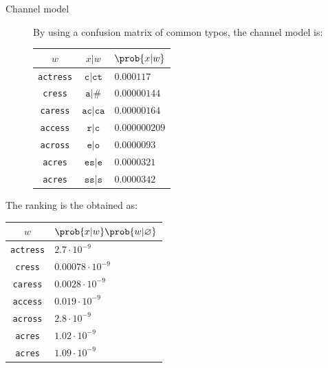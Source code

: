 \begin{example}
\begin{description}
        \item[Channel model] 
            By using a confusion matrix of common typos, the channel model is:
            \begin{table}[H]
                \centering
                \footnotesize
                \begin{tabular}{ccl}
                    \toprule
                    $w$ & $x | w$ & $\prob{x | w}$ \\
                    \midrule
                    \texttt{actress} & $\texttt{c}|\texttt{ct}$  & $0.000117$ \\
                    \texttt{cress}   & $\texttt{a}|\texttt{\#}$  & $0.00000144$ \\
                    \texttt{caress}  & $\texttt{ac}|\texttt{ca}$ & $0.00000164$ \\
                    \texttt{access}  & $\texttt{r}|\texttt{c}$   & $0.000000209$ \\
                    \texttt{across}  & $\texttt{e}|\texttt{o}$   & $0.0000093$ \\
                    \texttt{acres}   & $\texttt{es}|\texttt{e}$  & $0.0000321$ \\
                    \texttt{acres}   & $\texttt{ss}|\texttt{s}$  & $0.0000342$ \\
                    \bottomrule
                \end{tabular}
            \end{table}
    \end{description}

    The ranking is the obtained as:
    \begin{table}[H]
        \centering
        \footnotesize
        \begin{tabular}{cl}
            \toprule
            $w$ & $\prob{x | w} \prob{w | \varnothing}$ \\
            \midrule
            \texttt{actress} & $2.7 \cdot 10^{-9}$ \\
            \texttt{cress}   & $0.00078 \cdot 10^{-9}$ \\
            \texttt{caress}  & $0.0028 \cdot 10^{-9}$ \\
            \texttt{access}  & $0.019 \cdot 10^{-9}$ \\
            \texttt{across}  & $2.8 \cdot 10^{-9}$ \\
            \texttt{acres}   & $1.02 \cdot 10^{-9}$ \\
            \texttt{acres}   & $1.09 \cdot 10^{-9}$ \\
            \bottomrule
        \end{tabular}
    \end{table}


\end{example}
